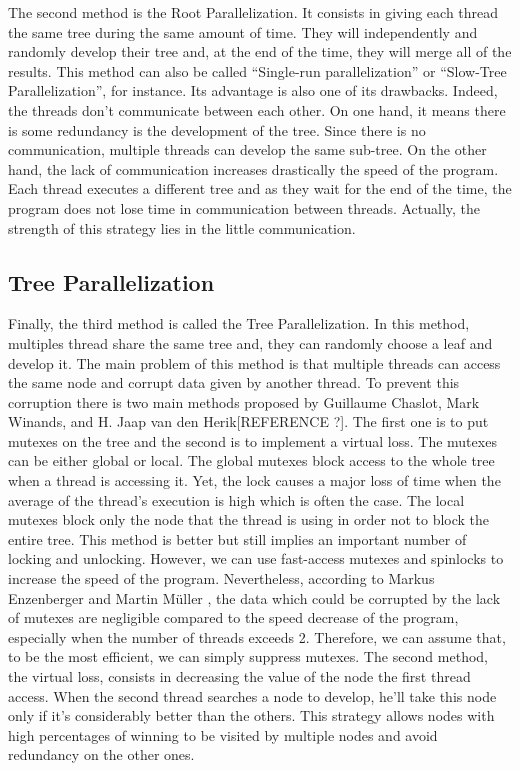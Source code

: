The second method is the Root Parallelization. It consists in giving each thread the same tree during the same amount of time. They will independently and randomly develop their tree and, at the end of the time, they will merge all of the results. This method can also be called “Single-run parallelization” or “Slow-Tree Parallelization”, for instance.
\newline
\newline
Its advantage is also one of its drawbacks. Indeed, the threads don’t communicate between each other. On one hand, it means there is some redundancy is the development of the tree. Since there is no communication, multiple threads can develop the same sub-tree. On the other hand, the lack of communication increases drastically the speed of the program. Each thread executes a different tree and as they wait for the end of the time, the program does not lose time in communication between threads. Actually, the strength of this strategy lies in the little communication.

\subsection{Tree Parallelization}

Finally, the third method is called the Tree Parallelization. In this method, multiples thread share the same tree and, they can randomly choose a leaf and develop it. The main problem of this method is that multiple threads can access the same node and corrupt data given by another thread. To prevent this corruption there is two main methods proposed by Guillaume Chaslot, Mark Winands, and H. Jaap van den Herik[REFERENCE ?]. The first one is to put mutexes on the tree and the second is to implement a virtual loss.
\newline
\newline
The mutexes can be either global or local. The global mutexes block access to the whole tree when a thread is accessing it. Yet, the lock causes a major loss of time when the average of the thread’s execution is high which is often the case. The local mutexes block only the node that the thread is using in order not to block the entire tree. This method is better but still implies an important number of locking and unlocking. However, we can use fast-access mutexes and spinlocks to increase the speed of the program.
\newline
\newline
Nevertheless, according to Markus Enzenberger and Martin Müller \cite{L1}, the data which could be corrupted by the lack of mutexes are negligible compared to the speed decrease of the program, especially when the number of threads exceeds 2. Therefore, we can assume that, to be the most efficient, we can simply suppress mutexes.
\newline
\newline
The second method, the virtual loss, consists in decreasing the value of the node the first thread access. When the second thread searches a node to develop, he’ll take this node only if it’s considerably better than the others. This strategy allows nodes with high percentages of winning to be visited by multiple nodes and avoid redundancy on the other ones.

